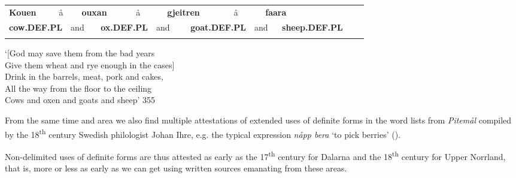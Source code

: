 \begin{tabular}{llllllllllllllll}
\lsptoprule
{\bfseries Kouen} & \multicolumn{2}{l}{å

} & \multicolumn{2}{l}{{\bfseries ouxan}

} & \multicolumn{2}{l}{å

} & \multicolumn{2}{l}{{\bfseries gjeitren}

} & \multicolumn{2}{l}{å

} & \multicolumn{2}{l}{{\bfseries faara}

} & \multicolumn{2}{l}{} & \\
\multicolumn{2}{l}{{\bfseries cow.DEF.PL}

} & \multicolumn{2}{l}{and

} & \multicolumn{2}{l}{{\bfseries ox.DEF.PL}

} & \multicolumn{2}{l}{and

} & \multicolumn{2}{l}{{\bfseries goat.DEF.PL}

} & \multicolumn{2}{l}{and

} & \multicolumn{2}{l}{{\bfseries sheep.DEF.PL}

} & \multicolumn{2}{l}{}\\
\lspbottomrule
\end{tabular}

\begin{styleTranslation}
‘[God may save them from the bad years\\
Give them wheat and rye enough in the cases]\\
Drink in the barrels, meat, pork and cakes,\\
All the way from the floor to the ceiling\\
Cows and oxen and goats and sheep’ 355

\end{styleTranslation}

\begin{styleBodyTextFirst}
From the same time and area we also find multiple attestations of extended uses of definite forms in the word lists from \textit{Pitemål} compiled by the 18\textsuperscript{th} century Swedish philologist Johan Ihre, e.g. the typical expression \textit{nåpp bera }‘to pick berries’ (\citet{Reinhammar2002}).

\end{styleBodyTextFirst}

\begin{styleBodytextC}
Non-delimited uses of definite forms are thus attested as early as the 17\textsuperscript{th} century for Dalarna and the 18\textsuperscript{th} century for Upper Norrland, that is, more or less as early as we can get using written sources emanating from these areas. 

\end{styleBodytextC}

